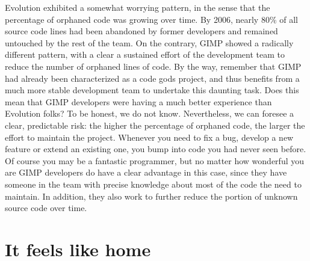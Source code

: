 Evolution exhibited a somewhat worrying pattern, in the sense that the percentage of orphaned code was growing over time. By 2006, nearly 80\% of all source code lines had been abandoned by former developers and remained untouched by the rest of the team. On the contrary, GIMP showed a radically different pattern, with a clear a sustained effort of the development team to reduce the number of orphaned lines of code. By the way, remember that GIMP had already been characterized  as a code gods project, and thus benefits from a much more stable development team to undertake this daunting task.
Does this mean that GIMP developers were having a much better experience than Evolution folks? To be honest, we do not know. Nevertheless, we can foresee a clear, predictable risk: the higher the percentage of orphaned code, the larger the effort to maintain the project. Whenever you need to fix a bug, develop a new feature or extend an existing one, you bump into code you had never seen before. Of course you may be a fantastic programmer, but no matter how wonderful you are GIMP developers do have a clear advantage in this case, since they have someone in the team with precise knowledge about most of the code the need to maintain. In addition, they also work to further reduce the portion of unknown source code over time.

\section*{It feels like home}

